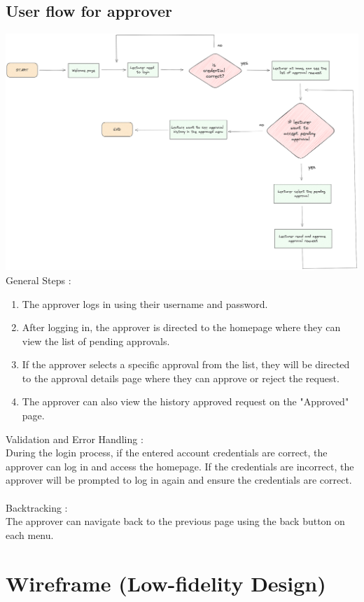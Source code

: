 \documentclass[12pt,titlepage,a4paper]{report}
\begin{document}
    \subsection{User flow for approver}
    \noindent
    \includegraphics[width=\textwidth]{images/figures/UIUX/Untitled 7.png}
    General Steps :
    \begin{enumerate}
        \item The approver logs in using their username and password.
        \item After logging in, the approver is directed to the homepage where they can view the list of pending approvals.
        \item If the approver selects a specific approval from the list, they will be directed to the approval details page where they can approve or reject the request.
        \item The approver can also view the history approved request on the "Approved" page.
    \end{enumerate}
    Validation and Error Handling :\\
    During the login process, if the entered account credentials are correct, the approver can log in and access the homepage. If the credentials are incorrect, the approver will be prompted to log in again and ensure the credentials are correct.\\\\
    Backtracking :\\
    The approver can navigate back to the previous page using the back button on each menu.
    \newpage
    \section{Wireframe (Low-fidelity Design)}
\end{document}
